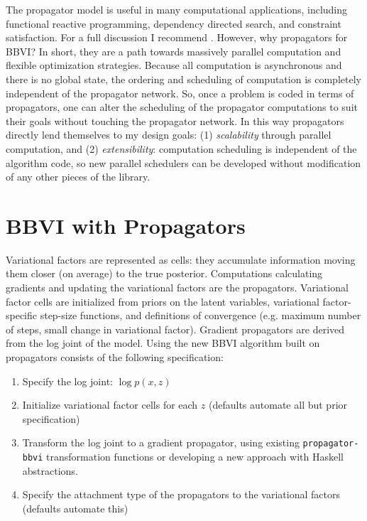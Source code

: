 \documentclass[12pt]{article}
\begin{document}
The propagator model is useful in many computational applications,
including functional reactive programming, dependency directed search,
and constraint satisfaction. For a full discussion I recommend
\citet{radul-2009}. However, why propagators for BBVI? In short, they
are a path towards massively parallel computation and flexible
optimization strategies. Because all computation is asynchronous and
there is no global state, the ordering and scheduling of computation
is completely independent of the propagator network. So, once a
problem is coded in terms of propagators, one can alter the scheduling
of the propagator computations to suit their goals without touching
the propagator network. In this way propagators directly lend
themselves to my design goals: (1) \textit{scalability} through
parallel computation, and (2) \textit{extensibility}: computation
scheduling is independent of the algorithm code, so new parallel
schedulers can be developed without modification of any other pieces
of the library.

\section{BBVI with Propagators}

Variational factors are represented as cells: they accumulate
information moving them closer (on average) to the true
posterior. Computations calculating gradients and updating the
variational factors are the propagators. Variational factor cells are
initialized from priors on the latent variables, variational
factor-specific step-size functions, and definitions of convergence
(e.g. maximum number of steps, small change in variational
factor). Gradient propagators are derived from the log joint of the
model. Using the new BBVI algorithm built on propagators consists of
the following specification:

\begin{enumerate}
\item Specify the log joint: $\log p(x, z)$
\item Initialize variational factor cells for each $z$ (defaults
  automate all but prior specification)
\item Transform the log joint to a gradient propagator, using
  existing \texttt{propagator-bbvi} transformation functions or
  developing a new approach with Haskell abstractions.
\item Specify the attachment type of the propagators to the
  variational factors (defaults automate this)
\end{enumerate}
\end{document}
